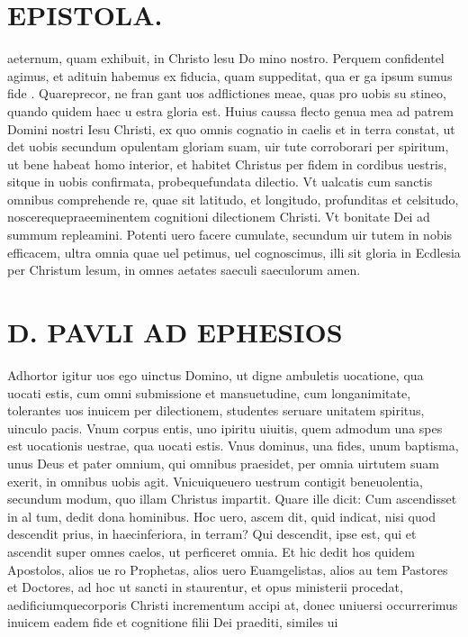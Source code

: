 \documentclass{article}
\begin{document}
\begin{pages}
\section*{EPISTOLA.  }
\marginpar{[ p.12 ]}
\marginpar{[ p.5.  ]}
\marginpar{[ p.6.  ]}
\marginpar{[ p.7. ]}
\marginpar{[ p.8. ]}
\marginpar{[ p.9. ]}\pstart aeternum, quam exhibuit, in Christo lesu Do mino nostro.  \pend\pstart Perquem confidentel agimus, et adituin habemus ex fiducia, quam suppeditat, qua er ga ipsum sumus fide . Quareprecor, ne fran gant uos adflictiones meae, quas pro uobis su stineo, quando quidem haec u estra gloria est.  \pend\pstart Huius caussa flecto genua mea ad patrem Domini nostri Iesu Christi, ex quo omnis cognatio in caelis et in terra constat, ut det uobis secundum opulentam gloriam suam, uir tute corroborari per spiritum, ut bene habeat homo interior, et habitet Christus per fidem in cordibus uestris, sitque in uobis confirmata, probequefundata dilectio.  \pend\pstart Vt ualcatis cum sanctis omnibus comprehende re, quae sit latitudo, et longitudo, profunditas et celsitudo, noscerequepraeeminentem cognitioni dilectionem Christi. Vt bonitate Dei ad summum repleamini.  \pend\pstart Potenti uero facere cumulate, secundum uir tutem in nobis efficacem, ultra omnia quae uel petimus, uel cognoscimus, illi sit gloria in Ecdlesia per Christum lesum, in omnes aetates saeculi saeculorum amen.  \pend
\section*{D. PAVLI AD EPHESIOS }
\marginpar{[ p.2. ]}
\marginpar{[ p.3.  ]}
\marginpar{[ p.4.  ]}\pstart Adhortor igitur uos ego uinctus Domino, ut digne ambuletis uocatione, qua uocati estis, cum omni submissione et mansuetudine, cum longanimitate, tolerantes uos inuicem per dilectionem, studentes seruare unitatem spiritus, uinculo pacis.  \pend\pstart Vnum corpus entis, uno ipiritu uiuitis, quem admodum una spes est uocationis uestrae, qua uocati estis. Vnus dominus, una fides, unum baptisma, unus Deus et pater omnium, qui omnibus praesidet, per omnia uirtutem suam exerit, in omnibus uobis agit.  \pend\pstart Vnicuiqueuero uestrum contigit beneuolentia, secundum modum, quo illam Christus impartit. Quare ille dicit: Cum ascendisset in al tum, dedit dona hominibus. Hoc uero, ascem dit, quid indicat, nisi quod descendit prius, in haecinferiora, in terram? Qui descendit, ipse est, qui et ascendit super omnes caelos, ut perficeret omnia.  \pend\pstart Et hic dedit hos quidem Apostolos, alios ue ro Prophetas, alios uero Euamgelistas, alios au tem Pastores et Doctores, ad hoc ut sancti in staurentur, et opus ministerii procedat, aedificiumquecorporis Christi incrementum accipi at, donec uniuersi occurrerimus inuicem eadem fide et cognitione filii Dei praediti, similes ui  \pend

\end{pages}
\end{document}
